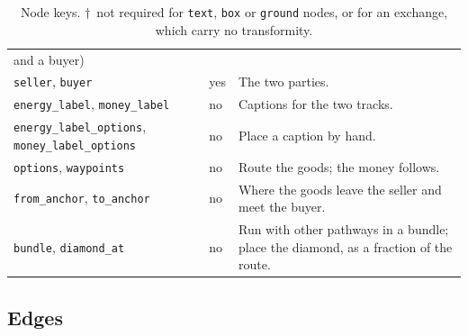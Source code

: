 \documentclass{article}
\begin{document}
\begin{table}[H]
\begin{tabular}{@{}>{\raggedright}p{} l p{}@{}}
{{and a buyer)}} \\
\texttt{seller}, \texttt{buyer} & yes & The two parties. \\
\texttt{energy\_label}, \texttt{money\_label} & no & Captions for the two tracks. \\
\texttt{energy\_label\_options}, \texttt{money\_label\_options} & no & Place a
caption by hand. \\
\texttt{options}, \texttt{waypoints} & no & Route the goods; the money follows. \\
\texttt{from\_anchor}, \texttt{to\_anchor} & no & Where the goods leave the seller and
meet the buyer. \\
\texttt{bundle}, \texttt{diamond\_at} & no & Run with other pathways in a bundle;
place the diamond, as a fraction of the route. \\
\bottomrule
\end{tabular}
\caption{Node keys. $\dagger$~not required for \texttt{text}, \texttt{box} or
\texttt{ground} nodes, or for an exchange, which carry no transformity.}
\end{table}

\subsection{Edges}
\end{document}
